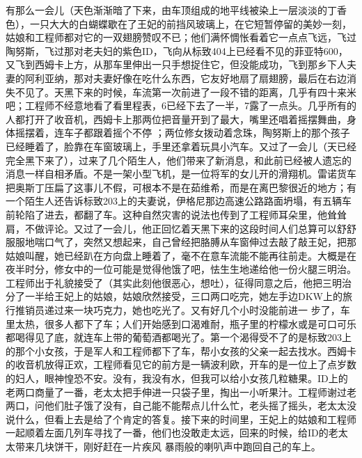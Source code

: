 \documentclass{article}
\begin{document}
有那么一会儿（天色渐渐暗了下来，由车顶组成的地平线被染上一层淡淡的丁香色），一只大大的白蝴蝶歇在了王妃的前挡风玻璃上，在它短暂停留的美妙一刻，姑娘和工程师都对它的一双翅膀赞叹不已；他们满怀惆怅看着它一点点飞远，飞过陶努斯，飞过那对老夫妇的紫色ID，飞向从标致404上已经看不见的菲亚特600，又飞到西姆卡上方，从那车里伸出一只手想捉住它，但没能成功，飞到那乡下人夫妻的阿利亚纳，那对夫妻好像在吃什么东西，它友好地扇了扇翅膀，最后在右边消失不见了。天黑下来的时候，车流第一次前进了一段不错的距离，几乎有四十来米吧；工程师不经意地看了看里程表，6已经下去了一半，7露了一点头。几乎所有的人都打开了收音机，西姆卡上那两位把音量开到了最大，嘴里还唱着摇摆舞曲，身体摇摆着，连车子都跟着摇个不停
\newpage
；两位修女拨动着念珠，陶努斯上的那个孩子已经睡着了，脸靠在车窗玻璃上，手里还拿着玩具小汽车。又过了一会儿（天已经完全黑下来了），过来了几个陌生人，他们带来了新消息，和此前已经被人遗忘的消息一样自相矛盾。不是一架小型飞机，是一位将军的女儿开的滑翔机。雷诺货车把奥斯丁压扁了这事儿不假，可根本不是在茹维希，而是在离巴黎很近的地方；有一个陌生人还告诉标致203上的夫妻说，伊格尼那边高速公路路面坍塌，有五辆车前轮陷了进去，都翻了车。这种自然灾害的说法也传到了工程师耳朵里，他耸耸肩，不做评论。又过了一会儿，他正回忆着天黑下来的这段时间人们总算可以舒舒服服地喘口气了，突然又想起来，自己曾经把胳膊从车窗伸过去敲了敲王妃，把那姑娘叫醒，她已经趴在方向盘上睡着了，毫不在意车流能不能再往前走。大概是在夜半时分，修女中的一位可能是觉得他饿了吧，怯生生地递给他一份火腿三明治。工程师出于礼貌接受了（其实此刻他很恶心，想吐），征得同意之后，他把三明治分了一半给王妃上的姑娘，姑娘欣然接受，三口两口吃完，她左手边DKW上的旅行推销员递过来一块巧克力，她也吃光了。又有好几个小时没能前进一
\newpage
步了，车里太热，很多人都下了车；人们开始感到口渴难耐，瓶子里的柠檬水或是可口可乐都喝得见了底，就连车上带的葡萄酒都喝光了。第一个渴得受不了的是标致203上的那个小女孩，于是军人和工程师都下了车，帮小女孩的父亲一起去找水。西姆卡的收音机放得正欢，工程师看见它的前方是一辆波利欧，开车的是一位上了点岁数的妇人，眼神惶恐不安。没有，我没有水，但我可以给小女孩几粒糖果。ID上的老两口商量了一番，老太太把手伸进一只袋子里，掏出一小听果汁。工程师谢过老两口，问他们肚子饿了没有，自己能不能帮点儿什么忙，老头摇了摇头，老太太没说什么，但看上去是给了个肯定的答复。接下来的时间里，王妃上的姑娘和工程师一起顺着左面几列车寻找了一番，他们也没敢走太远，回来的时候，给ID的老太太带来几块饼干，刚好赶在一片疾风
暴雨般的喇叭声中跑回自己的车上。 
\end{document}
